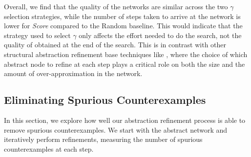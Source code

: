 Overall, we find that the quality of the networks are similar across the two
$\gamma$ selection strategies, while the number of steps
taken to arrive at the network is lower for \emph{Score} compared to the Random
baseline. This would indicate that the strategy used to select $\gamma$ only
affects the effort needed to do the search, not the quality of \abs obtained at
the end of the search. This is in contrast with other structural abstraction
refinement base techniques like \cite{cegar-nn,cegarette,cleverest-nn}, where
the choice of which abstract node to refine at each step plays a critical role
on both the size and the amount of over-approximation in the network.

\subsection{Eliminating Spurious Counterexamples}
\label{s:exp-mnist-rob}

In this section, we explore how well our abstraction refinement process is able
to remove spurious counterexamples. We start with the abstract network and
iteratively perform refinements, measuring the number of spurious
counterexamples at each step. 

